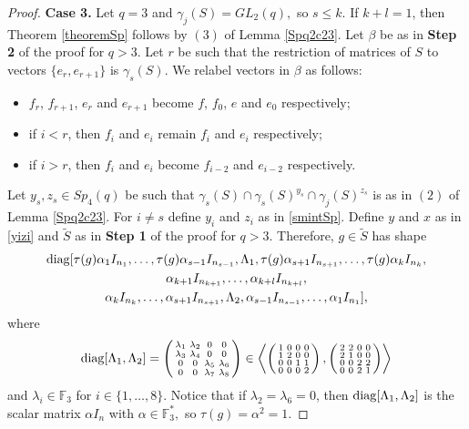 \begin{proof}
{\bf Case 3.} Let $q=3$ and $\gamma_j(S)=GL_2(q),$ so $s \le k.$
If $k+l=1$, then Theorem \ref{theoremSp} follows by $(3)$ of Lemma \ref{Spq2c23}. Let $\beta$ be as in {\bf Step 2} of the proof for $q>3$. Let $r$ be such that the restriction of matrices of $S$ to vectors $\{ e_r, e_{r+1}\}$ is $\gamma_s(S).$ We relabel vectors in $\beta$ as follows:
\begin{itemize}
\item $f_r$, $f_{r+1}$, $e_r$ and  $e_{r+1}$ become $f$, $f_0$, $e$ and $e_0$ respectively;
\item if $i<r$, then $f_i$ and $e_i$ remain $f_i$ and $e_i$ respectively;
\item if $i>r$, then  $f_i$ and $e_i$ become $f_{i-2}$ and $e_{i-2}$ respectively.
\end{itemize}
Let  ${y}_s, {z}_s \in Sp_4(q)$ be such that $\gamma_s(S) \cap \gamma_s(S)^{{y}_s} \cap \gamma_j(S)^{{z}_s}$ is as in $(2)$ of Lemma \ref{Spq2c23}. For $i \ne s$ define $y_i$ and $z_i$ as in \eqref{smintSp}. Define $y$ and $x$ as in \eqref{yizi} and $\tilde{S}$ as in {\bf Step 1} of the proof for $q>3.$
Therefore, $g \in \tilde{S}$ has shape 
\begin{multline*}
\mathrm{diag}[\tau(g)\alpha_1 I_{n_1}, \ldots, \tau(g)\alpha_{s-1} I_{n_{s-1}}, \Lambda_1,\tau(g)\alpha_{s+1} I_{n_{s+1}}, \ldots , \tau(g)\alpha_k I_{n_{k}}, \\
 \alpha_{k+1} I_{n_{k+1}}, \ldots, \alpha_{k+l} I_{n_{k+l}}, \\
 \alpha_k I_{n_k}, \ldots, \alpha_{s+1} I_{n_{s+1}}, \Lambda_2, \alpha_{s-1} I_{n_{s-1}},  \ldots, \alpha_1 I_{n_1} ],
\end{multline*}
where $$
\mathrm{diag}[\Lambda_1, \Lambda_2] = 
\left( \begin{smallmatrix}
\lambda_1&\lambda_2&0&0\\
\lambda_3&\lambda_4&0&0\\
0&0&\lambda_5&\lambda_6\\
0&0&\lambda_7&\lambda_8
\end{smallmatrix} \right) \in
 \left\langle \left( \begin{smallmatrix}
1&0&0&0\\
1&2&0&0\\
0&0&1&1\\
0&0&0&2
\end{smallmatrix} \right), \left( \begin{smallmatrix}
2&2&0&0\\
2&1&0&0\\
0&0&2&2\\
0&0&2&1
\end{smallmatrix} \right)
 \right\rangle$$ and $\lambda_i \in \mathbb{F}_3$ for $i \in \{1, \ldots, 8\}.$ Notice that if $\lambda_2=\lambda_6=0$, then $\mathrm{diag}[\Lambda_1, \Lambda_2]$ is the scalar matrix $\alpha I_n$ with $\alpha \in \mathbb{F}_3^*,$ so $\tau(g)=\alpha^2=1.$


\end{proof}
